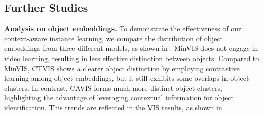 \documentclass[10pt,twocolumn,letterpaper]{article}
\begin{document}
\subsection{Further Studies}
\label{sec:further}

\textbf{Analysis on object embeddings.}
To demonstrate the effectiveness of our context-aware instance learning, we compare the distribution of object embeddings from three different models, as shown in .
MinVIS does not engage in video learning, resulting in less effective distinction between objects. 
Compared to MinVIS, CTVIS shows a clearer object distinction by employing contrastive learning among object embeddings, but it still exhibits some overlaps in object clusters.
In contrast, CAVIS forms much more distinct object clusters, highlighting the advantage of leveraging contextual information for object identification.
This trends are reflected in the VIS results, as shown in .





\end{document}

